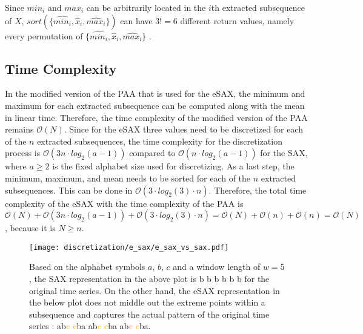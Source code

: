 Since $min_i$ and $max_i$ can be arbitrarily located in the $i$th extracted subsequence of $X$, $sort(\{\hat{min_i}, \hat{x}_i, \hat{max_i}\})$ can have $3! = 6$ different return values, namely every permutation of $\{\hat{min_i}, \hat{x}_i, \hat{max_i}\}$ \cite{E_SAX}.
\subsection*{Time Complexity}
In the modified version of the  \ac{PAA} that is used for the \ac{eSAX}, the minimum and maximum for each extracted subsequence can be computed along with the mean in linear time. Therefore, the time complexity of the modified version of the \ac{PAA} remains $\mathcal{O}(N)$. \newline
Since for the \ac{eSAX} three values need to be discretized for each of the $n$ extracted subsequences, the time complexity for the discretization process is $\mathcal{O}(3n \cdot log_{2}(a-1))$ compared to $\mathcal{O}(n \cdot log_{2}(a-1))$ for the \ac{SAX}, where $a \geq 2$ is the fixed alphabet size used for discretizing. \newline
As a last step, the minimum, maximum, and mean needs to be sorted for each of the $n$ extracted subsequences. This can be done in $\mathcal{O}(3 \cdot log_{2}(3) \cdot n)$. \newline
Therefore, the total time complexity of the \ac{eSAX} with the time complexity of the \ac{PAA} is $\mathcal{O}(N) + \mathcal{O}(3n \cdot log_{2}(a-1)) + \mathcal{O}(3 \cdot log_{2}(3) \cdot n) = \mathcal{O}(N) + \mathcal{O}(n) + \mathcal{O}(n) = \mathcal{O}(N)$, because it is $N \geq n$.
\begin{figure}[htb]
\centering
\texttt{[image: discretization/e\_sax/e\_sax\_vs\_sax.pdf]}
\caption[Extended Symbolic Aggregate Approximation - SAX vs. eSAX]{Based on the alphabet symbols $a$, $b$, $c$ and a window length of $w = 5$, the \ac{SAX} representation in the above plot is \textcolor[rgb]{0,0.39,0}{b} \textcolor[rgb]{0,0.39,0}{b} \textcolor[rgb]{0,0.39,0}{b} \textcolor[rgb]{0,0.39,0}{b} \textcolor[rgb]{0,0.39,0}{b} \textcolor[rgb]{0,0.39,0}{b} for the original time series. On the other hand, the \ac{eSAX} representation in the below plot does not middle out the extreme points within a subsequence and captures the actual pattern of the original time series \cite{E_SAX}: \textcolor[rgb]{0,0,0.39}{a}\textcolor[rgb]{0,0.39,0}{b}\textcolor{orange}{c} \textcolor{orange}{c}\textcolor[rgb]{0,0.39,0}{b}\textcolor[rgb]{0,0,0.39}{a} \textcolor[rgb]{0,0,0.39}{a}\textcolor[rgb]{0,0.39,0}{b}\textcolor{orange}{c} \textcolor{orange}{c}\textcolor[rgb]{0,0.39,0}{b}\textcolor[rgb]{0,0,0.39}{a} \textcolor[rgb]{0,0,0.39}{a}\textcolor[rgb]{0,0.39,0}{b}\textcolor{orange}{c} \textcolor{orange}{c}\textcolor[rgb]{0,0.39,0}{b}\textcolor[rgb]{0,0,0.39}{a}.}
\label{fig:SAX_E_SAX}
\end{figure}

